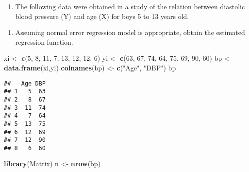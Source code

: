 \documentclass[
]{article}
\newenvironment{Shaded}{\begin{snugshade}}{\end{snugshade}}
\newcommand{\DecValTok}[1]{\textcolor[rgb]{0.00,0.00,0.81}{#1}}
\newcommand{\FunctionTok}[1]{\textcolor[rgb]{0.13,0.29,0.53}{\textbf{#1}}}
\newcommand{\NormalTok}[1]{#1}
\newcommand{\OtherTok}[1]{\textcolor[rgb]{0.56,0.35,0.01}{#1}}
\newcommand{\SpecialCharTok}[1]{\textcolor[rgb]{0.81,0.36,0.00}{\textbf{#1}}}
\newcommand{\StringTok}[1]{\textcolor[rgb]{0.31,0.60,0.02}{#1}}
\providecommand{\tightlist}{%
  \setlength{\itemsep}{0pt}\setlength{\parskip}{0pt}}
\begin{document}
\begin{enumerate}
\def\labelenumi{\arabic{enumi})}
\setcounter{enumi}{1}
\tightlist
\item
  The following data were obtained in a study of the relation between
  diastolic blood pressure (Y) and age (X) for boys 5 to 13 years old.
\end{enumerate}

\begin{enumerate}
\def\labelenumi{(\alph{enumi})}
\tightlist
\item
  Assuming normal error regression model is appropriate, obtain the
  estimated regression function.
\end{enumerate}

\begin{Shaded}
\begin{Highlighting}[]
\NormalTok{xi }\OtherTok{\textless{}{-}} \FunctionTok{c}\NormalTok{(}\DecValTok{5}\NormalTok{, }\DecValTok{8}\NormalTok{, }\DecValTok{11}\NormalTok{, }\DecValTok{7}\NormalTok{, }\DecValTok{13}\NormalTok{, }\DecValTok{12}\NormalTok{, }\DecValTok{12}\NormalTok{, }\DecValTok{6}\NormalTok{)}
\NormalTok{yi }\OtherTok{\textless{}{-}} \FunctionTok{c}\NormalTok{(}\DecValTok{63}\NormalTok{, }\DecValTok{67}\NormalTok{, }\DecValTok{74}\NormalTok{, }\DecValTok{64}\NormalTok{, }\DecValTok{75}\NormalTok{, }\DecValTok{69}\NormalTok{, }\DecValTok{90}\NormalTok{, }\DecValTok{60}\NormalTok{)}
\NormalTok{bp }\OtherTok{\textless{}{-}} \FunctionTok{data.frame}\NormalTok{(xi,yi)}
\FunctionTok{colnames}\NormalTok{(bp) }\OtherTok{\textless{}{-}} \FunctionTok{c}\NormalTok{(}\StringTok{"Age"}\NormalTok{, }\StringTok{"DBP"}\NormalTok{)}
\NormalTok{bp}
\end{Highlighting}
\end{Shaded}

\begin{verbatim}
##   Age DBP
## 1   5  63
## 2   8  67
## 3  11  74
## 4   7  64
## 5  13  75
## 6  12  69
## 7  12  90
## 8   6  60
\end{verbatim}

\begin{Shaded}
\begin{Highlighting}[]
\FunctionTok{library}\NormalTok{(Matrix)}
\NormalTok{n }\OtherTok{\textless{}{-}} \FunctionTok{nrow}\NormalTok{(bp)}
\end{Highlighting}
\end{Shaded}

\begin{Shaded}
\end{Shaded}
\end{document}
